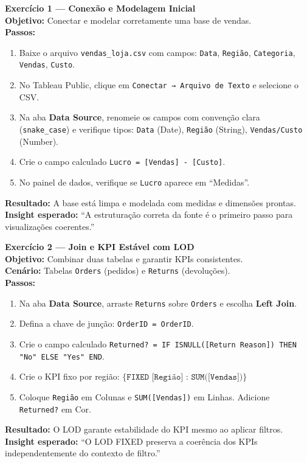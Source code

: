 \begin{SolvedBox}
\textbf{Exercício 1 — Conexão e Modelagem Inicial}\\[4pt]
\textbf{Objetivo:} Conectar e modelar corretamente uma base de vendas.\\[4pt]
\textbf{Passos:}
\begin{enumerate}[leftmargin=*]
  \item Baixe o arquivo \texttt{vendas\_loja.csv} com campos: \texttt{Data}, \texttt{Região}, \texttt{Categoria}, \texttt{Vendas}, \texttt{Custo}.
  \item No Tableau Public, clique em \texttt{Conectar → Arquivo de Texto} e selecione o CSV.
  \item Na aba \textbf{Data Source}, renomeie os campos com convenção clara (\texttt{snake\_case}) e verifique tipos:  
  \texttt{Data} (Date), \texttt{Região} (String), \texttt{Vendas/Custo} (Number).
  \item Crie o campo calculado \texttt{Lucro = [Vendas] - [Custo]}.
  \item No painel de dados, verifique se \texttt{Lucro} aparece em “Medidas”.
\end{enumerate}
\textbf{Resultado:} A base está limpa e modelada com medidas e dimensões prontas.\\
\textbf{Insight esperado:} “A estruturação correta da fonte é o primeiro passo para visualizações coerentes.”
\end{SolvedBox}


\begin{SolvedBox}
\textbf{Exercício 2 — Join e KPI Estável com LOD}\\[4pt]
\textbf{Objetivo:} Combinar duas tabelas e garantir KPIs consistentes.\\[4pt]
\textbf{Cenário:} Tabelas \texttt{Orders} (pedidos) e \texttt{Returns} (devoluções).\\[4pt]
\textbf{Passos:}
\begin{enumerate}[leftmargin=*]
  \item Na aba \textbf{Data Source}, arraste \texttt{Returns} sobre \texttt{Orders} e escolha \textbf{Left Join}.
  \item Defina a chave de junção: \texttt{OrderID = OrderID}.
  \item Crie o campo calculado \texttt{Returned? = IF ISNULL([Return Reason]) THEN "No" ELSE "Yes" END}.
  \item Crie o KPI fixo por região:  
  \(\{\texttt{FIXED [Região] : SUM([Vendas])}\}\)
  \item Coloque \texttt{Região} em Colunas e \texttt{SUM([Vendas])} em Linhas.  
        Adicione \texttt{Returned?} em Cor.
\end{enumerate}
\textbf{Resultado:} O LOD garante estabilidade do KPI mesmo ao aplicar filtros.\\
\textbf{Insight esperado:} “O LOD FIXED preserva a coerência dos KPIs independentemente do contexto de filtro.”
\end{SolvedBox}


